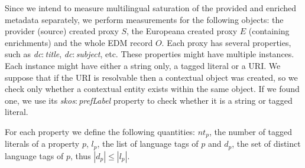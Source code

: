 







Since we intend to measure multilingual saturation of the provided and enriched metadata separately, we perform measurements for the following objects: the provider (source) created proxy $S$, the Europeana created proxy $E$ (containing enrichments) and the whole EDM record $O$. Each proxy has several properties, such as \textit{dc$:$title}, \textit{dc$:$subject}, etc. These properties might have multiple instances. Each instance might have either a string only, a tagged literal or a URI. We suppose that if the URI is resolvable then a contextual object was created, so we check only whether a contextual entity exists within the same object. If we found one, we use its \textit{skos$:$prefLabel} property to check whether it is a string or tagged literal.

For each property we define the following quantities: $nt_p$, the number of tagged literals of a property $p$, $l_p$, the list of language tags of $p$ and $d_p$, the set of distinct language tags of $p$, thus $|d_p| \leq |l_p|$.

